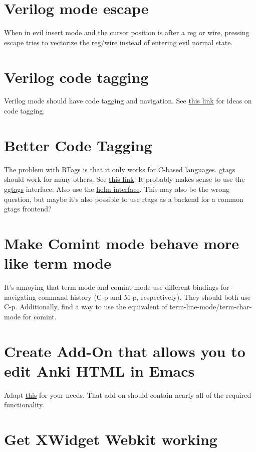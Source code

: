 \documentclass{default}
\begin{document}
\section{Verilog mode escape}

When in evil insert mode and the cursor position is after a reg or wire, pressing escape tries to
vectorize the reg/wire instead of entering evil normal state.

\section{Verilog code tagging}

Verilog mode should have code tagging and navigation. See
\href{https://scripter.co/ctags-systemverilog-and-emacs/}{this link} for ideas on code tagging.

\section{Better Code Tagging}

The problem with RTags is that it only works for C-based languages. gtags should work for many
others. See \href{https://tuhdo.github.io/c-ide.html}{this link}. It probably makes sense to use the
\href{https://github.com/leoliu/ggtags}{ggtags} interface. Also use the
\href{https://github.com/syohex/emacs-helm-gtags/}{helm interface}. This may also be the wrong
question, but maybe it's also possible to use rtags as a backend for a common gtags frontend?

\section{Make Comint mode behave more like term mode}

It's annoying that term mode and comint mode use different bindings for navigating command history
(C-p and M-p, respectively). They should both use C-p. Additionally, find a way to use the
equivalent of term-line-mode/term-char-mode for comint.

\section{Create Add-On that allows you to edit Anki HTML in Emacs}

Adapt \href{https://github.com/louietan/anki-editor}{this} for your needs. That add-on should
contain nearly all of the required functionality.

\section{Get XWidget Webkit working}
\end{document}
